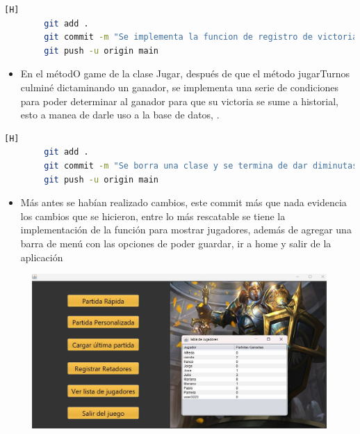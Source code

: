 \documentclass{article}
\begin{document}
	\begin{lstlisting}[language=bash,caption={Commit: 3e51aab60d8dfbb00b2b5d27c9e9d890677624a5 }][H]
		git add .
		git commit -m "Se implementa la funcion de registro de victorias"			
		git push -u origin main
	\end{lstlisting}
	
	
	\begin{itemize}
		\item En el métodO game de la clase Jugar, después de que el método jugarTurnos culminé dictaminando un ganador, se implementa una serie de condiciones para poder determinar al ganador para que su victoria se sume a historial, esto a manea de darle uso a la base de datos, .
	\end{itemize}
	
	
	
	
	\begin{lstlisting}[language=bash,caption={Commit: c3f9cabe03aa0fe30794dc4f15b4fe910aa38ab2 }][H]
		git add .
		git commit -m "Se borra una clase y se termina de dar diminutas funcionalidades a las clases"			
		git push -u origin main
	\end{lstlisting}
	
	
	\begin{itemize}
		\item Más antes se habían realizado cambios, este commit más que nada evidencia los cambios que se hicieron, entre lo más rescatable se tiene la implementación de la función para mostrar jugadores, además de agregar una barra de menú con las opciones de poder guardar, ir a home y salir de la aplicación  
	\end{itemize}
	
			\begin{figure}[H]
		\centering
		\includegraphics[width=1\textwidth,keepaspectratio]{img/historial.jpg}
	\end{figure}
	
\end{document}
